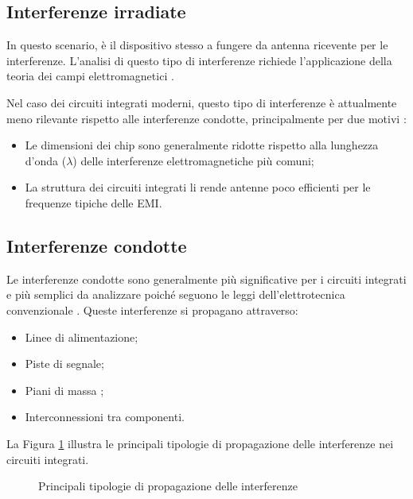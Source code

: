 \subsection{Interferenze irradiate}
In questo scenario, è il dispositivo stesso a fungere da antenna ricevente per le interferenze. L'analisi di questo tipo di interferenze richiede l'applicazione della teoria dei campi elettromagnetici \cite{capitolo2}. 

Nel caso dei circuiti integrati moderni, questo tipo di interferenze è attualmente meno rilevante rispetto alle interferenze condotte, principalmente per due motivi \cite{capitolo2}:
\begin{itemize}
    \item Le dimensioni dei chip sono generalmente ridotte rispetto alla lunghezza d'onda ($\lambda$) delle interferenze elettromagnetiche più comuni;
    \item La struttura dei circuiti integrati li rende antenne poco efficienti per le frequenze tipiche delle EMI.
\end{itemize}

\subsection{Interferenze condotte}
Le interferenze condotte sono generalmente più significative per i circuiti integrati e più semplici da analizzare poiché seguono le leggi dell'elettrotecnica convenzionale \cite{capitolo2}. Queste interferenze si propagano attraverso:
\begin{itemize}
    \item Linee di alimentazione;
    \item Piste di segnale;
    \item Piani di massa \cite{Susceptibility_of_the_Instrumentation_to_Conducted_EMI_Injected_Through_the_Ground_Plane};
    \item Interconnessioni tra componenti.
\end{itemize}

La Figura \ref{fig:propagazione_emi} illustra le principali tipologie di propagazione delle interferenze nei circuiti integrati.

\begin{figure}[ht]
    \centering
    \caption{Principali tipologie di propagazione delle interferenze}
    \label{fig:propagazione_emi}
\end{figure}

